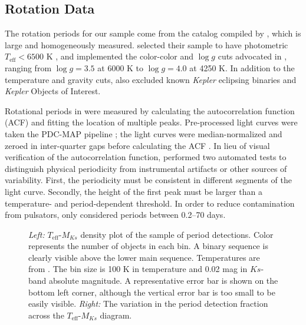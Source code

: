 \documentclass[twocolumn]{aastex6}
\newcommand{\Kepler}{\mbox{\textit{Kepler}}}
\newcommand{\Teff}{\ensuremath{T_{\textrm{eff}}}}
\newcommand{\logg}{\ensuremath{\log g}}
\newcommand{\MK}{\ensuremath{M_{Ks}}}
\begin{document}
\subsection{Rotation Data}

The rotation periods for our sample come from the catalog compiled by 
\citet{McQuillan14}, which is large and homogeneously measured. 
\citet{McQuillan14} selected their sample 
to have photometric \(\Teff < 6500\) K \citep{Brown11,Dressing13}, and 
implemented the color-color and \logg{} cuts advocated in \citet{Ciardi11}, 
ranging from \(\logg = 3.5\) at 6000 K to \(\logg = 4.0\) at 4250 K. 
In addition to the temperature and gravity cuts, \citet{McQuillan14} also 
excluded known \Kepler{} eclipsing binaries and \Kepler{} Objects of Interest. 

Rotational periods in \citet{McQuillan14} were measured by calculating the 
autocorrelation function (ACF) and fitting the location of multiple peaks.
Pre-processed light curves were taken the PDC-MAP pipeline
\citep{Smith12,Stumpe12}; the light curves were median-normalized and zeroed
in inter-quarter gaps before calculating the ACF \citep{McQuillan13}. In
lieu of visual verification of the autocorrelation function, \citet{McQuillan14}
performed two automated tests to distinguish physical periodicity from
instrumental artifacts or other sources of variability. First, the 
periodicity must be consistent in different segments of the light curve.
Secondly, the height of the first peak must be larger than a temperature- and
period-dependent threshold. In order to reduce contamination from pulsators, 
\citet{McQuillan14} only considered periods between 0.2--70 days.

\begin{figure*}[htb]
    \centering
    \caption{\emph{Left:} \Teff{}-\MK{} density plot of the sample of
        \citet{McQuillan14} period detections. Color represents the number of
        objects in each bin. A binary sequence is clearly 
        visible above the lower main sequence. Temperatures are from
        \citet{Pinsonneault12}. The bin size is 100 K in
        temperature and 0.02 mag in \(Ks\)-band absolute magnitude. A 
        representative error bar is shown on the bottom left corner, although
        the vertical error bar is too small to be easily visible. \emph{Right:} 
        The variation in the \citet{McQuillan14} period 
        detection fraction across the \Teff-\MK{} 
    diagram.}\label{fig:mcquillan_selection}
\end{figure*}
\end{document}
